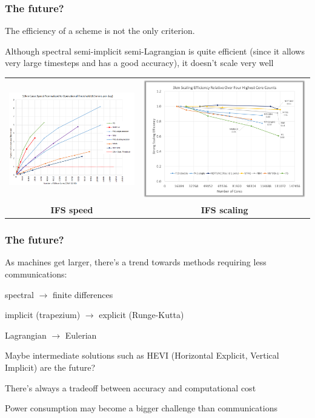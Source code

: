 \documentclass[aspectratio=43,9pt]{beamer}
\begin{document}
\begin{frame}
	\frametitle{The future?}
	\begin{myitemize}{3ex}
		\item The efficiency of a scheme is not the only criterion.
		\item Although spectral semi-implicit semi-Lagrangian is quite efficient (since it allows very large timesteps and has a good accuracy), it doesn't scale very well
	\end{myitemize}
	\begin{center}
		\begin{tabular}{cc}
			\includegraphics[width=.45\textwidth]{IFS_speed}	& \includegraphics[width=.45\textwidth]{IFS_scaling}	\\
			\textbf{IFS speed}	&	\textbf{IFS scaling}
		\end{tabular}
	\end{center}
\end{frame}
%
%
\begin{frame}
	\frametitle{The future?}
	\begin{myitemize}{3ex}
		\item As machines get larger, there's a trend towards methods requiring less communications:
			\begin{myitemize}{1ex}
				\item spectral $\rightarrow$ finite differences
				\item implicit (trapezium) $\rightarrow$ explicit (Runge-Kutta)
				\item Lagrangian $\rightarrow$ Eulerian
			\end{myitemize}
		\item Maybe intermediate solutions such as HEVI (Horizontal Explicit, Vertical Implicit) are the future?
		\item There's always a tradeoff between accuracy and computational cost
		\item Power consumption may become a bigger challenge than communications
	\end{myitemize}
\end{frame}
%
%
\end{document}
